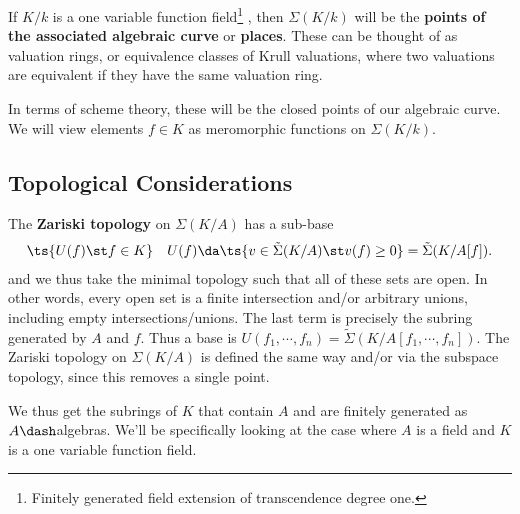 \begin{definition}

If \(K/k\) is a one variable function field\footnote{Finitely generated
  field extension of transcendence degree one.} , then \(\Sigma(K/k)\)
will be the \textbf{points of the associated algebraic curve} or
\textbf{places}. These can be thought of as valuation rings, or
equivalence classes of Krull valuations, where two valuations are
equivalent if they have the same valuation ring.

\end{definition}

\begin{remark}

In terms of scheme theory, these will be the closed points of our
algebraic curve. We will view elements \(f\in K\) as meromorphic
functions on \(\Sigma(K/k)\).

\end{remark}

\hypertarget{topological-considerations}{%
\subsection{Topological
Considerations}\label{topological-considerations}}

\begin{definition}

The \textbf{Zariski topology} on \(\Sigma(K/A)\) has a sub-base
\begin{align*}  
\ts{U(f) \st f\in K } && U(f) \da \ts{v\in \tilde \Sigma(K/A) \st v(f) \geq 0} = \tilde \Sigma(K/ A[f])
.\end{align*} and we thus take the minimal topology such that all of
these sets are open. In other words, every open set is a finite
intersection and/or arbitrary unions, including empty
intersections/unions. The last term is precisely the subring generated
by \(A\) and \(f\). Thus a base is
\(U(f_1, \cdots, f_n) = \tilde \Sigma(K / A[f_1, \cdots, f_n])\). The
Zariski topology on \(\Sigma(K/A)\) is defined the same way and/or via
the subspace topology, since this removes a single point.

\end{definition}

\begin{remark}

We thus get the subrings of \(K\) that contain \(A\) and are finitely
generated as \(A\dash\)algebras. We'll be specifically looking at the
case where \(A\) is a field and \(K\) is a one variable function field.

\end{remark}

